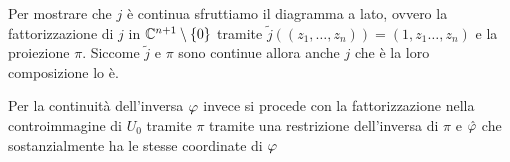 \begin{itemize}
	\begin{minipage}[t]{0.55\textwidth}
		Per mostrare che $j$ è continua sfruttiamo il diagramma a lato, ovvero la fattorizzazione di $j$ in $\mathbb{C}^{n+1}\setminus\{0\}$ tramite $\widetilde{j}((z_1,\dots,z_n))=(1,z_1\dots,z_n)$ e la proiezione $\pi$. Siccome $\widetilde{j}$ e $\pi$ sono continue allora anche $j$ che è la loro composizione lo è.
	\end{minipage}
 	\begin{minipage}[t]{0.13\textwidth}\vspace{-10pt}
 	\end{minipage}
	\begin{minipage}[t]{0.55\textwidth}
	Per la continuità dell'inversa $\oldphi$ invece si procede con la fattorizzazione nella controimmagine di $U_0$ tramite $\pi$ tramite una restrizione dell'inversa di $\pi$ e $\hat{\oldphi}$ che sostanzialmente ha le stesse coordinate di $\oldphi$
		
		
	\end{minipage}
	\begin{minipage}[t]{0.13\textwidth}\vspace{-10pt}
	\end{minipage}
\end{itemize}

